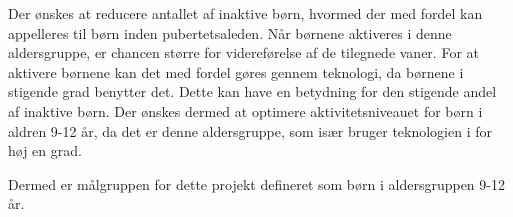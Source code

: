 Der ønskes at reducere antallet af inaktive børn, hvormed der med fordel kan appelleres til børn inden pubertetsaleden. Når børnene aktiveres i denne aldersgruppe, er chancen større for videreførelse af de tilegnede vaner. For at aktivere børnene kan det med fordel gøres gennem teknologi, da børnene i stigende grad benytter det. Dette kan have en betydning for den stigende andel af inaktive børn. Der ønskes dermed at optimere aktivitetsniveauet for børn i aldren 9-12 år, da det er denne aldersgruppe, som især bruger teknologien i for høj en grad. 
%
%

Dermed er målgruppen for dette projekt defineret som børn i aldersgruppen 9-12 år.